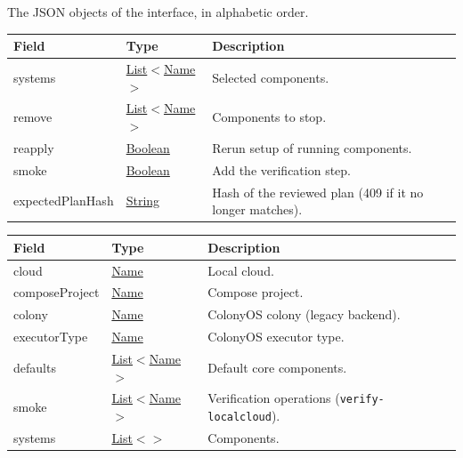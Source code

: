 \documentclass[a4paper]{arrowhead}
\newcommand{\mref}[2][]{{\textcolor{ArrowheadPurple}{\hyperref[sec:model:#2]{\ifstrempty{#1}{#2}{#1}}}}}
\newcommand{\pref}[1]{{\textcolor{ArrowheadGrey}{\hyperref[sec:model:primitives:#1]{#1}}}}
\begin{document}
The JSON objects of the interface, in alphabetic order.


\noindent\begin{tabularx}{\textwidth}{| >{\raggedright\arraybackslash}p{3.6cm} | >{\raggedright\arraybackslash\small}p{4.4cm} | X |} \hline
\rowcolor{gray!33} Field & Type & Description \\ \hline
systems & \pref{List}$<$\pref{Name}$>$ & Selected components. \\ \hline
remove & \pref{List}$<$\pref{Name}$>$ & Components to stop. \\ \hline
reapply & \pref{Boolean} & Rerun setup of running components. \\ \hline
smoke & \pref{Boolean} & Add the verification step. \\ \hline
expectedPlanHash & \pref{String} & Hash of the reviewed plan (409 if it no longer matches). \\ \hline
\end{tabularx}


\noindent\begin{tabularx}{\textwidth}{| >{\raggedright\arraybackslash}p{3.6cm} | >{\raggedright\arraybackslash\small}p{4.4cm} | X |} \hline
\rowcolor{gray!33} Field & Type & Description \\ \hline
cloud & \pref{Name} & Local cloud. \\ \hline
composeProject & \pref{Name} & Compose project. \\ \hline
colony & \pref{Name} & ColonyOS colony (legacy backend). \\ \hline
executorType & \pref{Name} & ColonyOS executor type. \\ \hline
defaults & \pref{List}$<$\pref{Name}$>$ & Default core components. \\ \hline
smoke & \pref{List}$<$\pref{Name}$>$ & Verification operations (\texttt{verify-localcloud}). \\ \hline
systems & \pref{List}$<$\mref{Component}$>$ & Components. \\ \hline
\end{tabularx}

\end{document}
